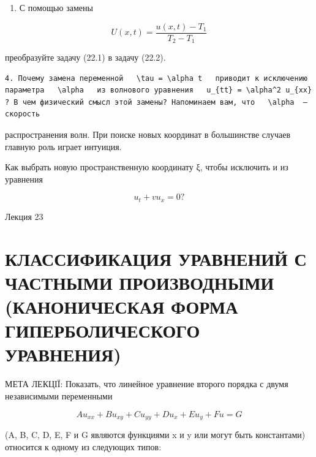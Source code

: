 \documentclass[
  ukrainian,
]{article}
\providecommand{\tightlist}{%
  \setlength{\itemsep}{0pt}\setlength{\parskip}{0pt}}
\begin{document}
\begin{enumerate}
\def\labelenumi{\arabic{enumi}.}
\setcounter{enumi}{2}
\tightlist
\item
  С помощью замены
\end{enumerate}

\[
U(x, t) = \frac{u(x, t) - T_1}{T_2 - T_1}
\]

преобразуйте задачу (22.1) в задачу (22.2).

\begin{verbatim}
4. Почему замена переменной   \tau = \alpha t   приводит к исключению параметра   \alpha   из волнового уравнения   u_{tt} = \alpha^2 u_{xx}  ? В чем физический смысл этой замены? Напоминаем вам, что   \alpha  —скорость
\end{verbatim}

распространения волн. При поиске новых координат в большинстве случаев
главную роль играет интуиция.

Как выбрать новую пространственную координату ξ, чтобы исключить и из
уравнения

\[
u_t + vu_x = 0?
\]

Лекция 23

\section{КЛАССИФИКАЦИЯ УРАВНЕНИЙ С ЧАСТНЫМИ ПРОИЗВОДНЫМИ (КАНОНИЧЕСКАЯ
ФОРМА ГИПЕРБОЛИЧЕСКОГО
УРАВНЕНИЯ)}\label{ux43aux43bux430ux441ux441ux438ux444ux438ux43aux430ux446ux438ux44f-ux443ux440ux430ux432ux43dux435ux43dux438ux439-ux441-ux447ux430ux441ux442ux43dux44bux43cux438-ux43fux440ux43eux438ux437ux432ux43eux434ux43dux44bux43cux438-ux43aux430ux43dux43eux43dux438ux447ux435ux441ux43aux430ux44f-ux444ux43eux440ux43cux430-ux433ux438ux43fux435ux440ux431ux43eux43bux438ux447ux435ux441ux43aux43eux433ux43e-ux443ux440ux430ux432ux43dux435ux43dux438ux44f}

МЕТА ЛЕКЦІЇ: Показать, что линейное уравнение второго порядка с двумя
независимыми переменными

\[
Au_{xx} + Bu_{xy} + Cu_{yy} + Du_x + Eu_y + Fu = G
\]

(A, B, C, D, E, F и G являются функциями x и y или могут быть
константами) относится к одному из следующих типов:
\end{document}

